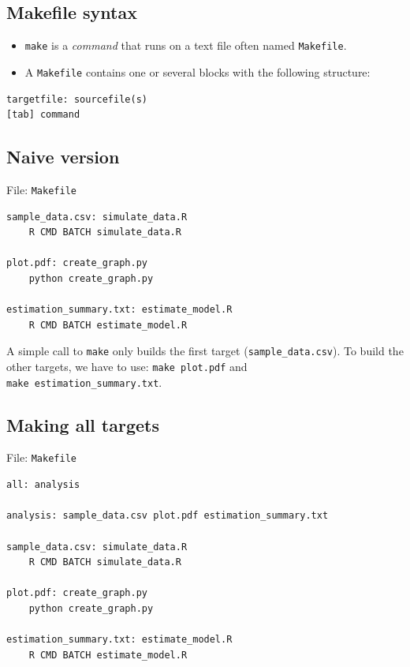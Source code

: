 \documentclass[]{book}
\theoremstyle{definition}
\theoremstyle{definition}
\theoremstyle{definition}
\theoremstyle{remark}
\begin{document}
\subsection{Makefile syntax}\label{makefile-syntax}

\begin{itemize}
\item
  \texttt{make} is a \emph{command} that runs on a text file often named
  \texttt{Makefile}.
\item
  A \texttt{Makefile} contains one or several blocks with the following
  structure:
\end{itemize}

\begin{verbatim}
targetfile: sourcefile(s)
[tab] command
\end{verbatim}

\subsection{Naive version}\label{naive-version}

File: \texttt{Makefile}

\begin{verbatim}
sample_data.csv: simulate_data.R
    R CMD BATCH simulate_data.R

plot.pdf: create_graph.py
    python create_graph.py

estimation_summary.txt: estimate_model.R
    R CMD BATCH estimate_model.R
\end{verbatim}

A simple call to \texttt{make} only builds the first target
(\texttt{sample\_data.csv}). To build the other targets, we have to use:
\texttt{make\ plot.pdf} and \texttt{make\ estimation\_summary.txt}.

\subsection{Making all targets}\label{making-all-targets}

File: \texttt{Makefile}

\begin{verbatim}
all: analysis

analysis: sample_data.csv plot.pdf estimation_summary.txt

sample_data.csv: simulate_data.R
    R CMD BATCH simulate_data.R

plot.pdf: create_graph.py
    python create_graph.py

estimation_summary.txt: estimate_model.R
    R CMD BATCH estimate_model.R
\end{verbatim}
\end{document}
